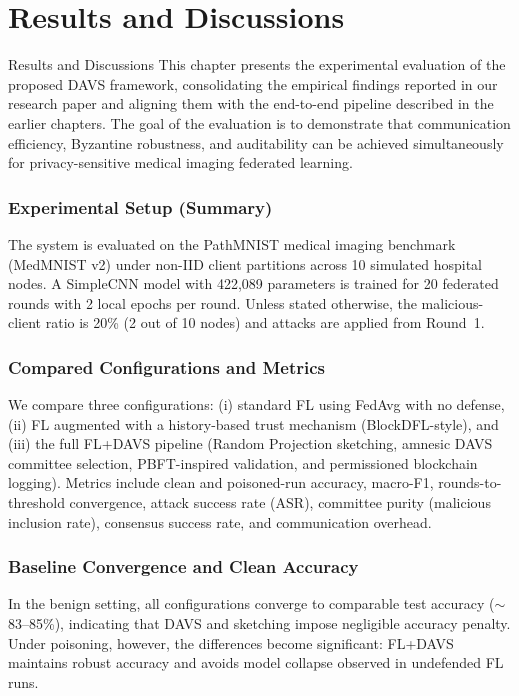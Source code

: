 \chapter[Results and Discussions]{Results and Discussions}{Results and Discussions}\label{res}
This chapter presents the experimental evaluation of the proposed DAVS framework, consolidating the empirical findings reported in our research paper and aligning them with the end-to-end pipeline described in the earlier chapters. The goal of the evaluation is to demonstrate that communication efficiency, Byzantine robustness, and auditability can be achieved simultaneously for privacy-sensitive medical imaging federated learning.

\subsection{Experimental Setup (Summary)}
The system is evaluated on the PathMNIST medical imaging benchmark (MedMNIST v2) under non-IID client partitions across 10 simulated hospital nodes. A SimpleCNN model with 422,089 parameters is trained for 20 federated rounds with 2 local epochs per round. Unless stated otherwise, the malicious-client ratio is 20\% (2 out of 10 nodes) and attacks are applied from Round~1.

\subsection{Compared Configurations and Metrics}
We compare three configurations: (i) standard FL using FedAvg with no defense, (ii) FL augmented with a history-based trust mechanism (BlockDFL-style), and (iii) the full FL+DAVS pipeline (Random Projection sketching, amnesic DAVS committee selection, PBFT-inspired validation, and permissioned blockchain logging). Metrics include clean and poisoned-run accuracy, macro-F1, rounds-to-threshold convergence, attack success rate (ASR), committee purity (malicious inclusion rate), consensus success rate, and communication overhead.

\subsection{Baseline Convergence and Clean Accuracy}
In the benign setting, all configurations converge to comparable test accuracy (\(\sim\)83--85\%), indicating that DAVS and sketching impose negligible accuracy penalty. Under poisoning, however, the differences become significant: FL+DAVS maintains robust accuracy and avoids model collapse observed in undefended FL runs.

